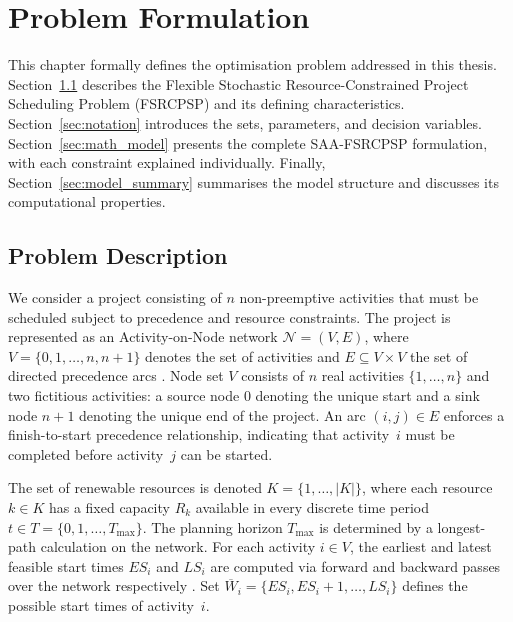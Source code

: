 \chapter{Problem Formulation}
\label{chap:formulation}

This chapter formally defines the optimisation problem addressed
in this thesis. Section~\ref{sec:problem_desc} describes the
Flexible Stochastic Resource-Constrained Project Scheduling
Problem (FSRCPSP) and its defining characteristics.
Section~\ref{sec:notation} introduces the sets, parameters, and
decision variables. Section~\ref{sec:math_model} presents the
complete SAA-FSRCPSP formulation, with each constraint explained
individually. Finally, Section~\ref{sec:model_summary} summarises
the model structure and discusses its computational properties.

\section{Problem Description}
\label{sec:problem_desc}

We consider a project consisting of $n$ non-preemptive activities
that must be scheduled subject to precedence and resource
constraints. The project is represented as an Activity-on-Node
network $\mathcal{N} = (V, E)$, where
$V = \{0, 1, \ldots, n, n+1\}$ denotes the set of activities and
$E \subseteq V \times V$ the set of directed precedence arcs
\parencite{Pritsker1969}. Node set $V$ consists of $n$ real
activities $\{1, \ldots, n\}$ and two fictitious activities: a
source node $0$ denoting the unique start and a sink node $n+1$
denoting the unique end of the project. An arc $(i, j) \in E$
enforces a finish-to-start precedence relationship, indicating
that activity~$i$ must be completed before activity~$j$ can be
started.

The set of renewable resources is denoted
$K = \{1, \ldots, |K|\}$, where each resource $k \in K$ has a
fixed capacity $R_k$ available in every discrete time period
$t \in T = \{0, 1, \ldots, T_{\max}\}$. The planning horizon
$T_{\max}$ is determined by a longest-path calculation on the
network. For each activity $i \in V$, the earliest and latest
feasible start times $ES_i$ and $LS_i$ are computed via forward
and backward passes over the network respectively
\parencite{Kelley1963}. Set
$\overline{W}_i = \{ES_i, ES_i + 1, \ldots, LS_i\}$ defines
the possible start times of activity~$i$.

